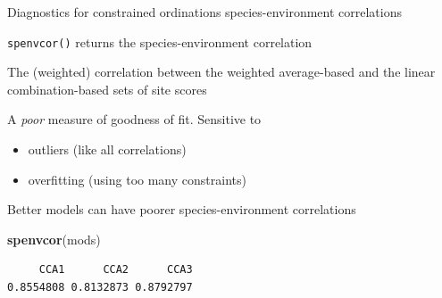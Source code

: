 \documentclass[10pt,ignorenonframetext,compress, aspectratio=169]{beamer}
\newenvironment{Shaded}{\begin{snugshade}}{\end{snugshade}}
\newcommand{\KeywordTok}[1]{\textcolor[rgb]{0.13,0.29,0.53}{\textbf{{#1}}}}
\newcommand{\NormalTok}[1]{{#1}}
\providecommand{\tightlist}{%
  \setlength{\itemsep}{0pt}\setlength{\parskip}{0pt}}
\begin{document}
\begin{frame}[fragile]{Diagnostics for constrained ordinations
\textbar{} species-environment correlations}

\texttt{spenvcor()} returns the species-environment correlation

The (weighted) correlation between the weighted average-based and the
linear combination-based sets of site scores

A \emph{poor} measure of goodness of fit. Sensitive to

\begin{itemize}
\tightlist
\item
  outliers (like all correlations)
\item
  overfitting (using too many constraints)
\end{itemize}

Better models can have poorer species-environment correlations

\scriptsize

\begin{Shaded}
\begin{Highlighting}[]
\KeywordTok{spenvcor}\NormalTok{(mods)}
\end{Highlighting}
\end{Shaded}

\begin{verbatim}
     CCA1      CCA2      CCA3 
0.8554808 0.8132873 0.8792797 
\end{verbatim}

\normalsize

\end{frame}
\end{document}

